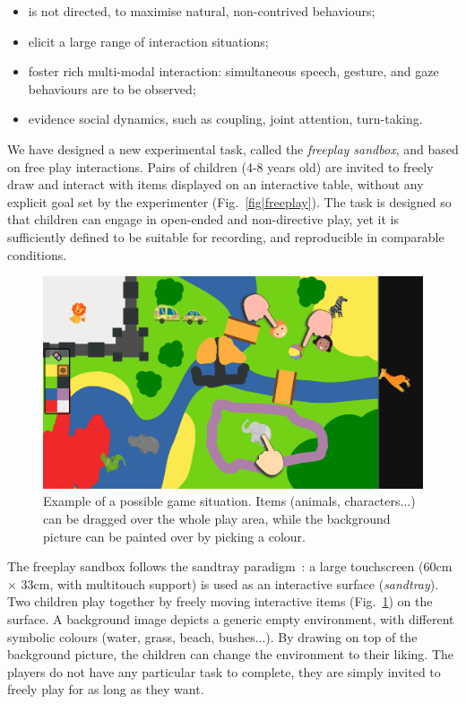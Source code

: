 \documentclass{article}
\begin{document}
\begin{itemize}
    \item is not directed, to maximise natural, non-contrived behaviours;
    \item elicit a large range of interaction situations;
    \item foster rich multi-modal interaction: simultaneous speech, gesture, and gaze
        behaviours are to be observed;
    \item evidence social dynamics, such as coupling, joint attention, turn-taking.
\end{itemize}

We have designed a new experimental task, called the \emph{freeplay sandbox}, and based on 
free play interactions. Pairs of children (4-8 years old) are invited to freely draw and interact with items
displayed on an interactive table, without any explicit goal set by the experimenter (Fig.~\ref{fig|freeplay}).
The task is designed so that children can engage in open-ended and non-directive play, yet it is
sufficiently defined to be suitable for recording, and reproducible in comparable conditions.

\begin{figure}[ht!]
    \centering
    \includegraphics[width=0.8\linewidth]{sandbox}
    \caption{Example of a possible game situation. Items (animals,
    characters...) can be dragged over the whole play area, while the background
    picture can be painted over by picking a colour.}

    \label{fig|sandbox}
\end{figure}

The freeplay sandbox follows the sandtray
paradigm~\cite{baxter2012touchscreen}: a large touchscreen (60cm $\times$ 33cm,
with multitouch support) is used as an interactive surface (\emph{sandtray}). Two children play together
by freely moving interactive items (Fig.~\ref{fig|sandbox}) on the surface. A background image
depicts a generic empty environment, with different symbolic colours (water,
grass, beach, bushes...). By drawing on top of the background picture, the
children can change the environment to their liking. The players do not have any particular task to
complete, they are simply invited to freely play for as long as they want.
\end{document}
